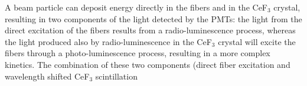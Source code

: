 \documentclass[a4paper,11pt]{article}
\begin{document}
A beam particle can deposit energy directly in the fibers
and in the CeF$_3$ crystal, resulting in two components of the light detected
by the PMTs: the light from the direct excitation of the fibers results from a
radio-lumine\-scen\-ce process, whereas the light produced also by radio-lumine\-scen\-ce
 in the CeF$_3$ crystal will excite the fibers through a photo-luminescence
process, resulting in a more complex kinetics. The combination of these two
components (direct fiber excitation and wavelength shifted CeF$_3$ scintillation
\end{document}
